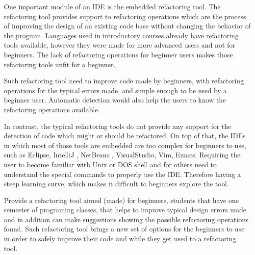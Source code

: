 One important module of an IDE is the embedded refactoring tool. %
The refactoring tool provides support to refactoring operations which are the process of improving the design
of an existing code base \cite{fowler1999refactoring} without changing the behavior of the program.
Languages used in introductory courses already have refactoring tools available, %
however they were made for more advanced users and not for beginners.
The lack of refactoring operations for beginner users makes those refactoring tools
unfit for a beginner.

Such refactoring tool need to improve code made by beginners, with refactoring operations for %
the typical errors made, and simple enough to be used by a beginner user.
Automatic detection would also help the users to know the refactoring operations available. %

In contrast, the typical refactoring tools do not provide any support for the detection of code which might or should %
be refactored.
On top of that, the IDEs in which most of those tools are embedded are too complex for beginners
to use, such as Eclipse\cite{carlson2005eclipse}, IntelliJ \cite{bock2011intellij}, NetBeans \cite{boudreau2002netbeans},
 VisualStudio, Vim\cite{moolenaar2008vim}, Emacs\cite{stallman2007gnu}.
Requiring the user to become familiar with Unix or DOS shell and for others need to
understand the special commands to properly use the IDE. %
Therefore having a steep learning curve, which makes it difficult to beginners
explore the tool. %

Provide a refactoring tool aimed (made) for beginners, students that have one semester %
of programing classes, that helps to improve typical design errors made and in addition can
make suggestions showing the possible refactoring operations found.
Such refactoring tool brings a new set of options for the beginners to use
in order to safely improve their code and while they get used to a refactoring tool.



